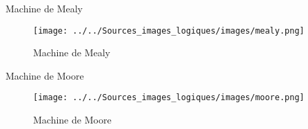 \documentclass[presentation]{beamer}
\begin{document}
\begin{frame}[label={sec:org26e23c5}]{Machine de Mealy}
\begin{figure}[htbp]
\centering
\texttt{[image: ../../Sources\_images\_logiques/images/mealy.png]}
\caption{\label{fig:org7fbfceb}Machine de Mealy}
\end{figure}
\end{frame}

\begin{frame}[label={sec:org21e27ea}]{Machine de Moore}
\begin{figure}[htbp]
\centering
\texttt{[image: ../../Sources\_images\_logiques/images/moore.png]}
\caption{\label{fig:orgaa31e29}Machine de Moore}
\end{figure}
\end{frame}
\end{document}
